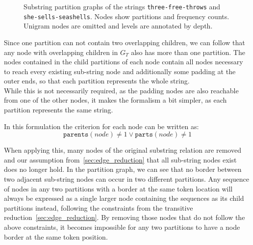 \begin{figure}
\begin{subfigure}[c]{0.50\textwidth}
    \end{subfigure}
    \caption{Substring partition graphs of the strings \texttt{three-free-throws} and \texttt{she-sells-seashells}. Nodes show partitions and frequency counts. Unigram nodes are omitted and levels are annotated by depth.}
\end{figure}

\label{def:partitions}

\noindent Since one partition can not contain two overlapping children, we can follow that any node with overlapping children in $G_T$ also has more than one partition. The nodes contained in the child partitions of each node contain all nodes necessary to reach every existing sub-string node and additionally some padding at the outer ends, so that each partition represents the whole string.\\
While this is not necessarily required, as the padding nodes are also reachable from one of the other nodes, it makes the formalism a bit simpler, as each partition represents the same string.

\noindent
In this formulation the criterion for each node can be written as:
\[
    \texttt{parents}(node) \neq 1 \lor \texttt{parts}(node) \neq 1
\]

When applying this, many nodes of the original substring relation are removed and our assumption from~\ref{sec:edge_reduction} that all sub-string nodes exist does no longer hold. In the partition graph, we can see that no border between two adjacent sub-string nodes can occur in two different partitions. Any sequence of nodes in any two partitions with a border at the same token location will always be expressed as a single larger node containing the sequences as its child partitions instead, following the constraints from the transitive reduction~\ref{sec:edge_reduction}. By removing those nodes that do not follow the above constraints, it becomes impossible for any two partitions to have a node border at the same token position.

